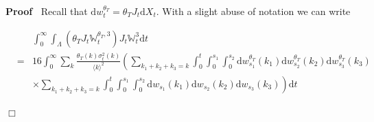 \documentclass[11pt]{article}
\newcommand{\mathd}{\mathrm{d}}
\newenvironment{proof}{\noindent\textbf{Proof\ }}{\hspace*{\fill}$\Box$\medskip}
\begin{document}
\begin{proof}
  Recall that $\mathd w_t^{\theta_T} = \theta_T J_t \mathd X_t$. With a slight
  abuse of notation we can write
  
  \[ \begin{array}{lll}
       &  & \int^{\infty}_0 \int_{\Lambda} (\theta_T J_t
       \mathbb{W}_t^{\theta_T, 3}) J_t \mathbb{W}_t^3 \mathd t\\
       & = & 16 \int^{\infty}_0 \sum_k \frac{\theta_T (k) \sigma^2_t
       (k)}{\langle k \rangle^2} \left( \sum_{k_1 + k_2 + k_3 = k} \int^t_0
       \int^{s_1}_0 \int^{s_2}_0 \mathd w_{s_1}^{\theta_T} (k_1) \mathd
       w_{s_2}^{\theta_T} (k_2) \mathd w^{\theta_T}_{s_3} (k_3) \right.\\
       &  & \times \left. \sum_{k_1 + k_2 + k_3 = k} \int^t_0 \int^{s_1}_0
       \int^{s_2}_0 \mathd w_{s_1} (k_1) \mathd w_{s_2} (k_2) \mathd w_{s_3}
       (k_3)  \right) \mathd t
     \end{array}  \]
  

\end{proof}
\end{document}
